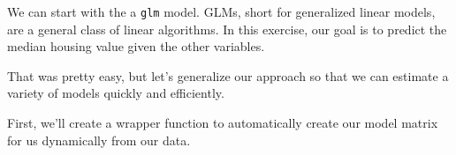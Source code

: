 \documentclass[]{book}
\newenvironment{Shaded}{\begin{snugshade}}{\end{snugshade}}
\newcommand{\KeywordTok}[1]{\textcolor[rgb]{0.13,0.29,0.53}{\textbf{#1}}}
\newcommand{\DataTypeTok}[1]{\textcolor[rgb]{0.13,0.29,0.53}{#1}}
\newcommand{\StringTok}[1]{\textcolor[rgb]{0.31,0.60,0.02}{#1}}
\newcommand{\OperatorTok}[1]{\textcolor[rgb]{0.81,0.36,0.00}{\textbf{#1}}}
\newcommand{\NormalTok}[1]{#1}
\theoremstyle{definition}
\theoremstyle{definition}
\theoremstyle{definition}
\theoremstyle{remark}
\begin{document}
We can start with the a \texttt{glm} model. GLMs, short for generalized
linear models, are a general class of linear algorithms. In this
exercise, our goal is to predict the median housing value given the
other variables.

\begin{Shaded}
\end{Shaded}

That was pretty easy, but let's generalize our approach so that we can
estimate a variety of models quickly and efficiently.

First, we'll create a wrapper function to automatically create our model
matrix for us dynamically from our data.
\end{document}
